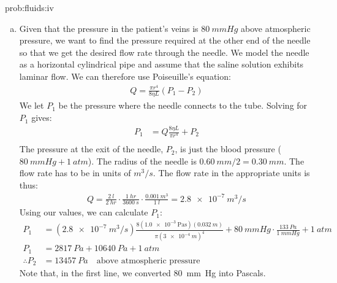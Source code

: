 {{\begin{solution}{prob:fluids:iv}\label{soln:fluids:iv}
\begin{enumerate}[(a)]
\item Given that the pressure in the patient's veins is $\SI{80}{mm Hg}$ above atmospheric pressure, we want to find the pressure required at the other end of the needle so that we get the desired flow rate through the needle. We model the needle as a horizontal cylindrical pipe and assume that the saline solution exhibits laminar flow. We can therefore use Poiseuille's equation:
\begin{align*}
Q=\frac{\pi r^4}{8\eta L}(P_1-P_2)
\end{align*}
We let $P_1$ be the pressure where the needle connects to the tube. Solving for $P_1$ gives:
\begin{align*}
P_1&=Q\frac{8\eta L}{\pi r^4}+P_2\\
\end{align*}
The pressure at the exit of the needle, $P_2$, is just the blood pressure ($\SI{80}{mm Hg} + \SI{1}{atm}$). The radius of the needle is $\SI{0.60}{mm}/2=\SI{0.30}{mm}$. The flow rate has to be in units of $\si{m^3/s}$. The flow rate in the appropriate units is thus:
\begin{align*}
Q=\frac{\SI{2}{l}}{\SI{2}{hr}}\cdot \frac{\SI{1}{hr}}{\SI{3600}{s}}\cdot \frac{\SI{0.001}{m^3}}{\SI{1}{l}}=\SI{2.8e-7}{m^3/s}
\end{align*}
Using our values, we can calculate $P_1$:
\begin{align*}
P_1&=(\SI{2.8e-7}{m^3/s})\frac{8(\SI{1.0e-3}{\pascal\second}) (\SI{0.032}{m})}{\pi (\SI{3e-4}{m})^4}+\SI{80}{mm Hg}\cdot \frac{\SI{133}{Pa}}{\SI{1}{mm Hg}}+\SI{1}{atm}\\
P_1&=\SI{2817}{Pa}+\SI{10640}{Pa}+\SI{1}{atm}\\
\therefore P_2&=\SI{13457}{Pa} \quad \textrm{above atmospheric pressure}
\end{align*}
Note that, in the first line, we converted \SI{80}{mm Hg} into Pascals. 


\end{enumerate}
\end{solution}}}

